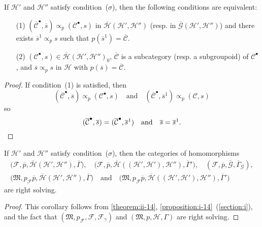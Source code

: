 \documentclass[a4paper,fleqn]{article}
\theoremstyle{plain}
\newenvironment{corollary}[1]
  {\renewcommand\theinnercorollary{#1}\innercorollary}
  {\endinnercorollary}
\theoremstyle{definition}
\newcommand{\oldpage}[1]{{\marginpar{\footnotesize$\bigg\vert$\,\,\,\,\textit{p.~#1}}}}
\newcommand{\textand}{\quad\text{and}\quad}
\newcommand{\CC}{\mathcal{C}}
\newcommand{\HH}{\mathcal{H}}
\newcommand{\MM}{\mathfrak{M}}
\newcommand{\FF}{\mathcal{F}}
\newcommand{\subs}{\mathrel{\propto}}
\newcommand{\GG}{\mathcal{G}}
\begin{document}
\begin{corollary}{1}
  If $\HH'$ and $\HH''$ satisfy condition~($\sigma$), then the following conditions are equivalent:
  \begin{enumerate}
    \item[\normalfont(1)]
      $(\overline{\CC}^\bullet,\overline{s})\subs_{\overline{p}}(\CC^\bullet,s)$ in $\overline{\HH}(\HH',\HH'')$ (resp. in $\overline{\GG}(\HH',\HH'')$) and there exists $\overline{s}^1\subs_p s$ such that $p(\overline{s}^1)=\overline{\CC}$.

    \item[\normalfont(2)]
      $(\CC^\bullet,s)\in\overline{\HH}(\HH',\HH'')_0$, $\overline{\CC}$ is a subcategory (resp. a subgroupoid) of $\CC^\bullet$, and $\overline{s}\subs_p s$ in $\HH$ with $p(\overline{s})=\overline{\CC}$.
  \end{enumerate}
\end{corollary}

\begin{proof}
  \oldpage{417}
  If condition~(1) is satisfied, then
  \[
    (\overline{\CC}^\bullet,\overline{s})\subs_{\overline{p}}(\CC^\bullet,s)
    \textand
    (\overline{\CC}^\bullet,\overline{s}^1)\subs_{\overline{p}}(\CC,s)
  \]
  so
  \[
    (\overline{\CC}^\bullet,\overline{s})=(\overline{\CC}^\bullet,\overline{s}^1)
    \textand
    \overline{s}=\overline{s}^1.
    \qedhere
  \]
\end{proof}

\begin{corollary}{2}
  If $\HH'$ and $\HH''$ satisfy condition~($\sigma$), then the categories of homomorphisms
  \[
    \begin{gathered}
      \big(\FF,\overline{p},\overline{\HH}(\HH',\HH''),\overline{\Gamma}\big),
      \quad
      \big(\FF,\overline{p},\overline{\HH}((\HH',\HH'),\HH''),\overline{\Gamma}'\big),
      \quad
      (\FF,\overline{p},\overline{\GG},\overline{\Gamma}_\GG),
    \\\big(\MM,p_\FF\overline{p},\overline{\HH}(\HH',\HH''),\overline{\Gamma}\big)
      \textand
      \big(\MM,p_\FF\overline{p},\overline{\HH}((\HH',\HH'),\HH''),\overline{\Gamma}'\big)
    \end{gathered}
  \]
  are right solving.
\end{corollary}

\begin{proof}
  This corollary follows from \cref{theorem:ii-14}, \cref{proposition:i-14}~(\cref{section:i}), and the fact that $(\MM,p_\FF,\FF,\FF_\gamma)$ and $(\MM,p,\HH,\Gamma)$ are right solving.
\end{proof}
\end{document}
